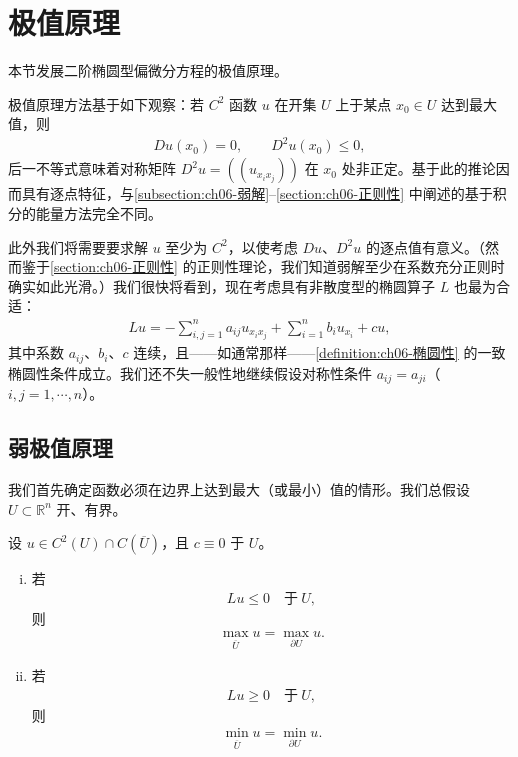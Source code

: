 \documentclass[../../main.tex]{subfiles}
\begin{document}
\section{极值原理}\label{section:ch06-极值原理}

本节发展二阶椭圆型偏微分方程的极值原理。

极值原理方法基于如下观察：若 $C^{2}$ 函数 $u$ 在开集 $U$ 上于某点 $x_{0}\in U$ 达到最大值，则
\begin{align}
Du(x_{0})=0,\qquad D^{2}u(x_{0})\leqslant 0,
\end{align}
后一不等式意味着对称矩阵 $D^{2}u=((u_{x_{i}x_{j}}))$ 在 $x_{0}$ 处非正定。基于此的推论因而具有逐点特征，与\cref{subsection:ch06-弱解}--\cref{section:ch06-正则性} 中阐述的基于积分的能量方法完全不同。

此外我们将需要要求解 $u$ 至少为 $C^{2}$，以使考虑 $Du$、$D^{2}u$ 的逐点值有意义。（然而鉴于\cref{section:ch06-正则性} 的正则性理论，我们知道弱解至少在系数充分正则时确实如此光滑。）我们很快将看到，现在考虑具有非散度型的椭圆算子 $L$ 也最为合适：
\begin{align}
Lu=-\sum_{i,j=1}^{n}a_{ij}u_{x_{i}x_{j}}+\sum_{i=1}^{n}b_{i}u_{x_{i}}+cu,
\end{align}
其中系数 $a_{ij}$、$b_{i}$、$c$ 连续，且——如通常那样——\cref{definition:ch06-椭圆性} 的一致椭圆性条件成立。我们还不失一般性地继续假设对称性条件 $a_{ij}=a_{ji}$（$i,j=1,\cdots,n$）。

\subsection{弱极值原理}\label{subsection:ch06-弱极值}

我们首先确定函数必须在边界上达到最大（或最小）值的情形。我们总假设 $U\subset\mathbb{R}^{n}$ 开、有界。

\begin{theorem}[弱极值原理]\label{theorem:ch06-弱极值}设 $u\in C^{2}(U)\cap C(\overline{U})$，且 $c\equiv 0$ 于 $U$。
\begin{enumerate}[(i)]
\item 若
\begin{align}
Lu\leqslant 0\quad\text{于}\ U,
\end{align}
则
\begin{align*}
\max_{\overline{U}}u=\max_{\partial U}u.
\end{align*}
\item 若
\begin{align}
Lu\geqslant 0\quad\text{于}\ U,
\end{align}
则
\begin{align*}
\min_{\overline{U}}u=\min_{\partial U}u.
\end{align*}
\end{enumerate}
\end{theorem}
\end{document}
